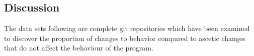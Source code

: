 \subsection{Discussion}

The data sets following are complete git repositories which have been examined to discover the proportion of changes to behavior compared to ascetic changes that do not affect the behaviour of the program. 

% 
% 

